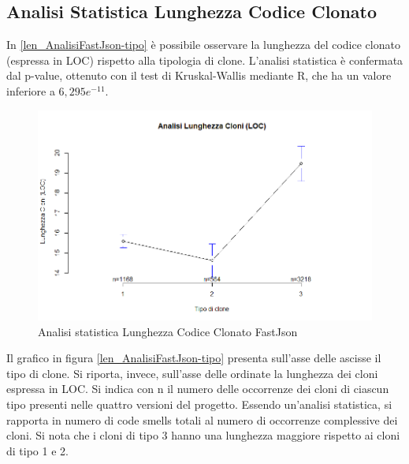 \subsection{Analisi Statistica Lunghezza Codice Clonato}
In \autoref{len_AnalisiFastJson-tipo} è possibile osservare la lunghezza del codice clonato (espressa in LOC) rispetto alla tipologia di clone. L'analisi statistica è confermata dal p-value, ottenuto con il test di Kruskal-Wallis mediante R, che ha un valore inferiore a $6,295e^{-11}$. \newpage
\begin{figure}[htbp]
	\centering
	\includegraphics[scale=0.5]{analisi_R/AnalisiFastJson/3-gplot-len-type.png}
\caption{Analisi statistica Lunghezza Codice Clonato FastJson}
\label{len_AnalisiFastJson-tipo}
\end{figure}
Il grafico in figura \autoref{len_AnalisiFastJson-tipo} presenta sull'asse delle ascisse il tipo di clone. Si riporta, invece, sull'asse delle ordinate la lunghezza dei cloni espressa in LOC. Si indica con n il numero delle occorrenze dei cloni di ciascun tipo presenti nelle quattro versioni del progetto. Essendo un'analisi statistica, si rapporta in numero di code smells totali al numero di occorrenze complessive dei cloni. Si nota che i cloni di tipo 3 hanno una lunghezza maggiore rispetto ai cloni di tipo 1 e 2.